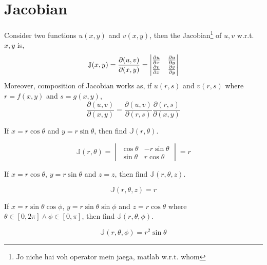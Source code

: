 \section{Jacobian}
Consider two functions $u(x,y)$ and $v(x,y)$, then the Jacobian\footnote{Jo niche hai voh operator mein jaega, matlab w.r.t. whom} of $u,v$ w.r.t. $x,y$ is,
\[\mathbb{J}(x,y)=\frac{\partial{(u,v)}}{\partial{(x,y)}}=\begin{vmatrix}
	\pdv{u}{x} & \pdv{u}{y}\\
	\pdv{v}{x} & \pdv{v}{y}
\end{vmatrix}\]
Moreover, composition of Jacobian works as, if $u(r,s)$ and $v(r,s)$ where $r=f(x,y)$ and $s=g(x,y)$,
\[\frac{\partial(u,v)}{\partial(x,y)}=\frac{\partial(u,v)}{\partial(r,s)}\frac{\partial(r,s)}{\partial(x,y)}\]
\begin{eg}
	If $x=r\cos\theta$ and $y=r\sin\theta$, then find $\mathbb{J}(r,\theta)$.
\end{eg}
\begin{explanation}
	\[\mathbb{J}(r,\theta)=\begin{vmatrix}
		\cos\theta & -r\sin\theta\\
		\sin\theta & r\cos\theta
	\end{vmatrix}=r\]
\end{explanation}
\begin{eg}
	If $x=r\cos\theta$, $y=r\sin\theta$ and $z=z$, then find $\mathbb{J}(r,\theta,z)$.
\end{eg}
\begin{explanation}
	\[\mathbb{J}(r,\theta, z)=r\]
\end{explanation}
\begin{eg}
	If $x=r\sin\theta\cos\phi$, $y=r\sin\theta\sin\phi$ and $z=r\cos\theta$ where $\theta\in [0,2\pi]\land \phi\in[0,\pi]$, then find $\mathbb{J}(r,\theta,\phi)$.
\end{eg}
\begin{explanation}
	\[\mathbb{J}(r,\theta,\phi)=r^2\sin\theta\]
\end{explanation}
